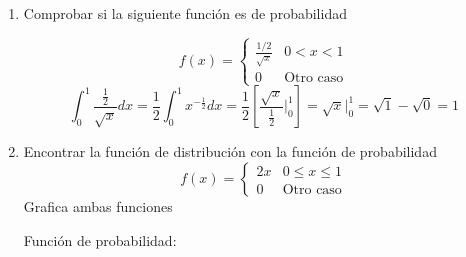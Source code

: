 \documentclass[a4paper, 12pt]{article}
\newcommand{\Pspace}{0.5cm}
\newcommand{\Aspace}{0.2cm}
\begin{document}
    \begin{enumerate}
        \item Comprobar si la siguiente función es de probabilidad \par
        \[
            f(x) =
            \begin{cases}
                \frac{1 / 2}{\sqrt{x}} & 0 < x < 1 \\
                0 & \text{Otro caso}
            \end{cases}
        \]
            \vspace{\Aspace}
            { \color{azul} 
                \[  \int_{0}^{1}\frac{\frac{1}{2}}{\sqrt{x}}dx 
                    = \frac{1}{2} \int_{0}^{1}x^{-\frac{1}{2}}dx
                    = \frac{1}{2} \left[ \frac{\sqrt{x}}{\frac{1}{2}} \Big|_{0}^{1} \right]
                    = \sqrt{x} \Big|_{0}^{1}
                    = \sqrt{1} - \sqrt{0} = 1
                \]
            }
        
        \newpage
        \vspace{\Pspace}
        \item Encontrar la función de distribución con la función de probabilidad
        \[
            f(x) =
            \begin{cases}
                2x & 0 \leq x \leq 1 \\
                0 & \text{Otro caso}
            \end{cases}
        \]       
        Grafica ambas funciones

            \vspace{\Aspace} \par
            { \color{azul} 
                Función de probabilidad: \par
                }
\end{enumerate}
\end{document}
